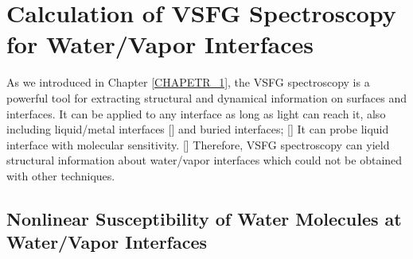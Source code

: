 \section{Calculation of VSFG Spectroscopy for Water/Vapor Interfaces}
As we introduced in Chapter \ref{CHAPETR_1}, the VSFG spectroscopy is a powerful tool for extracting structural and dynamical information
on surfaces and interfaces.
It can be applied to any interface as long as light can reach it, also including liquid/metal interfaces [\cite{Harris90,Harris90b,DaiHL95,Halevi96,Wieckowski99}] 
and buried interfaces; [\cite{Chen99,Chen07}]
It can probe liquid interface with molecular sensitivity. [\cite{Khatib16,Khatib16b,Khatib2017}]
Therefore, VSFG spectroscopy can yield structural information about water/vapor interfaces which could not be obtained with other techniques.

\subsection{Nonlinear Susceptibility of Water Molecules at Water/Vapor Interfaces}
